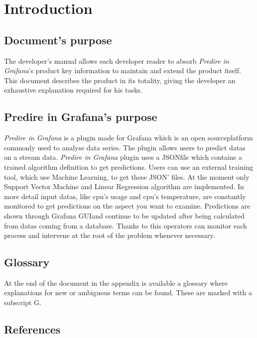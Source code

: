 \section{Introduction}
	\subsection{Document's purpose}
The developer's manual allows each developer reader to absorb \emph{Predire in Grafana\glo}'s product key information to maintain and extend the product itself.
This document describes the product in its totality, giving the developer an exhaustive explanation required for his tasks.
	
\subsection{Predire in Grafana’s purpose}
\emph{Predire in Grafana} is a plugin made for Grafana which is an open source\glo platform commonly used to analyse data series. The plugin allows users to predict datas on a stream data. \emph{Predire in Grafana} plugin uses a JSON\glo file which contains a trained algorithm definition to get predictions. Users can use an external training tool, which use Machine Learning\glo , to get these JSON' files. At the moment only Support Vector Machine and Linear Regression algorithm are implemented. In more detail input datas, like cpu's usage and cpu's temperature, are constantly monitored to get predictions on the aspect you want to examine. Predictions are shown through Grafana GUI\glo and continue to be updated after being calculated from datas coming from a database. Thanks to this operators can monitor each process and intervene at the root of the problem whenever necessary.


\subsection{Glossary}
At the end of the document in the appendix is available a glossary where explanations for new or ambiguous terms can be found. These are marked with a subscript G.

\subsection{References}
